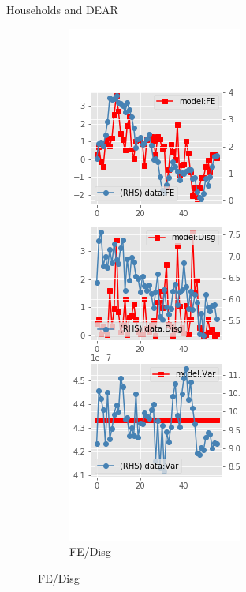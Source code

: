 \documentclass{beamer}
\begin{document}
\begin{frame}{Households and DEAR}
\begin{figure}[ht]
\begin{subfigure}[b]{0.2\textwidth}
		\end{subfigure}
		\hfill
		\begin{subfigure}[b]{0.2\textwidth}
			\caption{FE/Disg}
			\includegraphics[width=\textwidth, height = 0.8\textheight]{figuresDraft/sce_de_est_diag1.png}

\end{subfigure}
\end{figure}
\end{frame}
\end{document}
